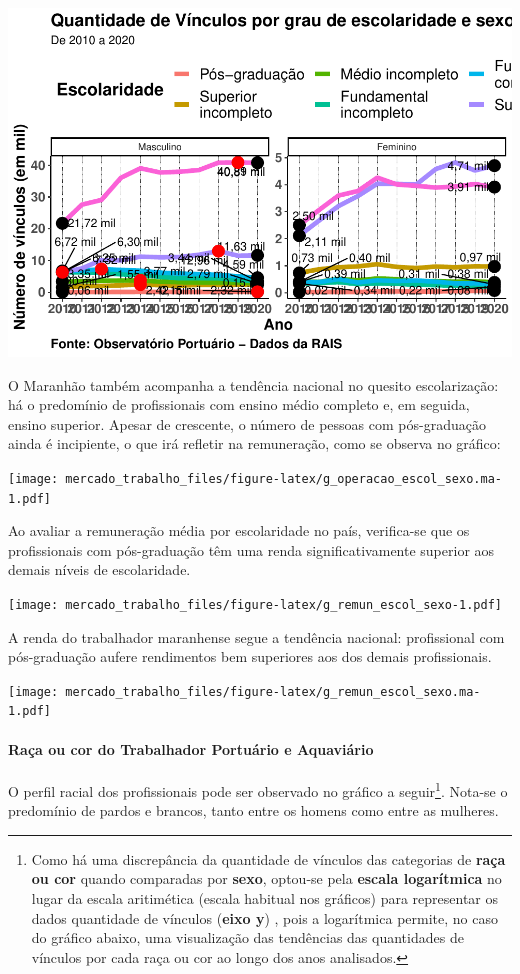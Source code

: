 \documentclass[
]{article}
\begin{document}
\includegraphics{mercado_trabalho_files/figure-latex/g_operacao_escol_sexo-1.pdf}

O Maranhão também acompanha a tendência nacional no quesito
escolarização: há o predomínio de profissionais com ensino médio
completo e, em seguida, ensino superior. Apesar de crescente, o número
de pessoas com pós-graduação ainda é incipiente, o que irá refletir na
remuneração, como se observa no gráfico:

\texttt{[image: mercado\_trabalho\_files/figure-latex/g\_operacao\_escol\_sexo.ma-1.pdf]}

Ao avaliar a remuneração média por escolaridade no país, verifica-se que
os profissionais com pós-graduação têm uma renda significativamente
superior aos demais níveis de escolaridade.

\texttt{[image: mercado\_trabalho\_files/figure-latex/g\_remun\_escol\_sexo-1.pdf]}

A renda do trabalhador maranhense segue a tendência nacional:
profissional com pós-graduação aufere rendimentos bem superiores aos dos
demais profissionais.

\texttt{[image: mercado\_trabalho\_files/figure-latex/g\_remun\_escol\_sexo.ma-1.pdf]}

\hypertarget{rauxe7a-ou-cor-do-trabalhador-portuuxe1rio-e-aquaviuxe1rio}{%
\paragraph{Raça ou cor do Trabalhador Portuário e
Aquaviário}\label{rauxe7a-ou-cor-do-trabalhador-portuuxe1rio-e-aquaviuxe1rio}}

O perfil racial dos profissionais pode ser observado no gráfico a
seguir\footnote{Como há uma discrepância da quantidade de vínculos das
  categorias de \textbf{raça ou cor} quando comparadas por
  \textbf{sexo}, optou-se pela \textbf{escala logarítmica} no lugar da
  escala aritimética (escala habitual nos gráficos) para representar os
  dados quantidade de vínculos (\textbf{eixo y}) , pois a logarítmica
  permite, no caso do gráfico abaixo, uma visualização das tendências
  das quantidades de vínculos por cada raça ou cor ao longo dos anos
  analisados.}. Nota-se o predomínio de pardos e brancos, tanto entre os
homens como entre as mulheres.
\end{document}
